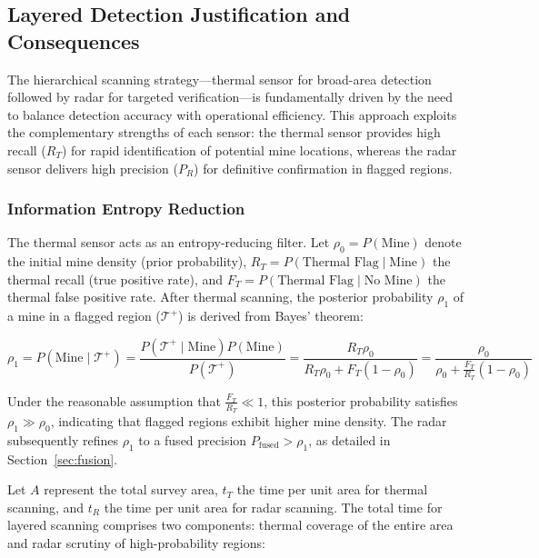 \subsection{Layered Detection Justification and Consequences} 
\label{sec:layered_approach}

The hierarchical scanning strategy---thermal sensor for broad-area detection followed by radar for targeted verification---is fundamentally driven by the need to balance detection accuracy with operational efficiency. This approach exploits the complementary strengths of each sensor: the thermal sensor provides high recall (\(R_T\)) for rapid identification of potential mine locations, whereas the radar sensor delivers high precision (\(P_R\)) for definitive confirmation in flagged regions.

\subsubsection{Information Entropy Reduction} 
The thermal sensor acts as an entropy-reducing filter. Let \(\rho_0 = P(\text{Mine})\) denote the initial mine density (prior probability), \(R_T = P(\text{Thermal Flag} \mid \text{Mine})\) the thermal recall (true positive rate), and \(F_T = P(\text{Thermal Flag} \mid \text{No Mine})\) the thermal false positive rate. After thermal scanning, the posterior probability \(\rho_1\) of a mine in a flagged region (\(\mathcal{T}^+\)) is derived from Bayes' theorem:

\begin{equation}
    \rho_1 = P(\text{Mine} \mid \mathcal{T}^+) = \frac{P(\mathcal{T}^+ \mid \text{Mine}) P(\text{Mine})}{P(\mathcal{T}^+)} = \frac{R_T \rho_0}{R_T \rho_0 + F_T (1 - \rho_0)} = \frac{\rho_0}{\rho_0 + \frac{F_T}{R_T} (1 - \rho_0)}
\end{equation}

Under the reasonable assumption that \(\frac{F_T}{R_T}\ll 1\), this posterior probability satisfies \(\rho_1 \gg \rho_0\), indicating that flagged regions exhibit higher mine density. The radar subsequently refines \(\rho_1\) to a fused precision \(P_{\text{fused}} > \rho_1\), as detailed in Section~\ref{sec:fusion}.

Let \(A\) represent the total survey area, \(t_T\) the time per unit area for thermal scanning, and \(t_R\) the time per unit area for radar scanning. The total time for layered scanning comprises two components: thermal coverage of the entire area and radar scrutiny of high-probability regions:

